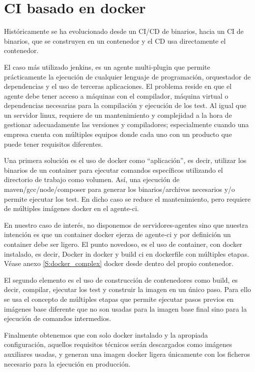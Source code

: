 \section{CI basado en docker}
Históricamente se ha evolucionado desde un CI/CD de binarios, hacia un CI de binarios, que se construyen en un contenedor y el CD usa directamente el contenedor.

 El caso más utilizado jenkins\cite{c_jenkins}, es un agente multi-plugin que permite prácticamente la ejecución de cualquier lenguaje de programación, orquestador de dependencias y el uso  de terceras aplicaciones. El problema reside en que el agente debe tener acceso a máquinas con el compilador, máquina virtual o dependencias necesarias para la compilación y ejecución de los test. Al igual que un servidor linux, requiere de un mantenimiento y complejidad a la hora de gestionar adecuadamente las versiones y compiladores; especialmente cuando una empresa cuenta con múltiples equipos donde cada uno con un producto que puede tener requisitos diferentes.

 Una primera solución es el uso de docker como “aplicación”, es decir, utilizar los binarios de un container para ejecutar comandos específicos utilizando el directorio de trabajo como volumen. Así, una ejecución de maven/gcc/node/composer para generar los binarios/archivos necesarios y/o permite ejecutar los test. En dicho caso se reduce el mantenimiento, pero requiere de múltiples imágenes docker en el agente-ci.

En nuestro caso de interés, no disponemos de servidores-agentes sino que nuestra intención es que un container docker ejerza de agente-ci y por definición un container debe ser ligero. El punto novedoso, es el uso de container, con docker instalado, es decir, Docker in docker\cite{c_dind} y build ci\cite{c_ci_docker} en dockerfile con múltiples\cite{c_docker_multistage} etapas. Véase anexo \ref{S:docker_complex} docker desde dentro del propio contenedor. 

El segundo elemento es el uso de construcción de contenedores como build, es decir, compilar, ejecutar los test y construir la imagen en un único paso. Para ello se usa el concepto de múltiples etapas\cite{c_docker_multistage} que permite ejecutar pasos previos en imágenes base diferente que no son usadas para la imagen base final sino para la ejecución de comandos intermedios. 

Finalmente obtenemos que con solo docker instalado y la apropiada configuración, aquellos requisitos técnicos serán descargados como imágenes auxiliares usadas, y generan una imagen docker ligera únicamente con los ficheros necesario para la ejecución en producción.


